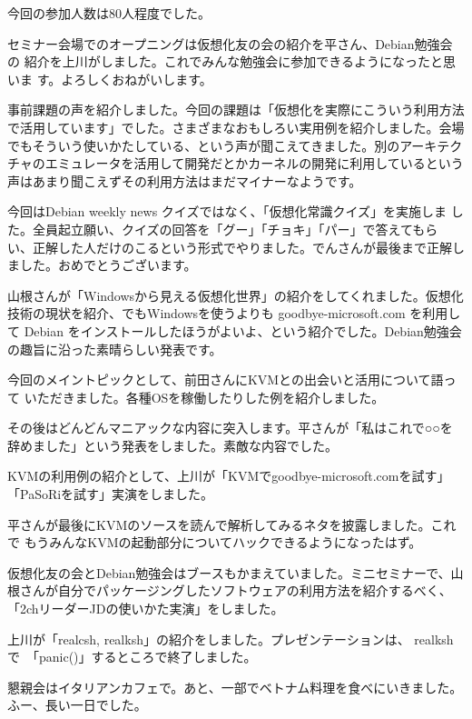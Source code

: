 \documentclass[mingoth,a4paper]{jsarticle}
\begin{document}
今回の参加人数は80人程度でした。

セミナー会場でのオープニングは仮想化友の会の紹介を平さん、Debian勉強会の
紹介を上川がしました。これでみんな勉強会に参加できるようになったと思いま
す。よろしくおねがいします。

事前課題の声を紹介しました。今回の課題は「仮想化を実際にこういう利用方法
で活用しています」でした。さまざまなおもしろい実用例を紹介しました。会場
でもそういう使いかたしている、という声が聞こえてきました。別のアーキテク
チャのエミュレータを活用して開発だとかカーネルの開発に利用しているという
声はあまり聞こえずその利用方法はまだマイナーなようです。

今回はDebian weekly news クイズではなく、「仮想化常識クイズ」を実施しま
した。全員起立願い、クイズの回答を「グー」「チョキ」「パー」で答えてもら
い、正解した人だけのこるという形式でやりました。でんさんが最後まで正解し
ました。おめでとうございます。

山根さんが「Windowsから見える仮想化世界」の紹介をしてくれました。仮想化
技術の現状を紹介、でもWindowsを使うよりも goodbye-microsoft.com を利用し
て Debian をインストールしたほうがよいよ、という紹介でした。Debian勉強会
の趣旨に沿った素晴らしい発表です。

今回のメイントピックとして、前田さんにKVMとの出会いと活用について語って
いただきました。各種OSを稼働したりした例を紹介しました。

その後はどんどんマニアックな内容に突入します。平さんが「私はこれで○○を
辞めました」という発表をしました。素敵な内容でした。

KVMの利用例の紹介として、上川が「KVMでgoodbye-microsoft.comを試す」
「PaSoRiを試す」実演をしました。

平さんが最後にKVMのソースを読んで解析してみるネタを披露しました。これで
もうみんなKVMの起動部分についてハックできるようになったはず。

仮想化友の会とDebian勉強会はブースもかまえていました。ミニセミナーで、山
根さんが自分でパッケージングしたソフトウェアの利用方法を紹介するべく、
「2chリーダーJDの使いかた実演」をしました。

上川が「realcsh, realksh」の紹介をしました。プレゼンテーションは、
realksh で　「panic()」するところで終了しました。

懇親会はイタリアンカフェで。あと、一部でベトナム料理を食べにいきました。
ふー、長い一日でした。
\end{document}
